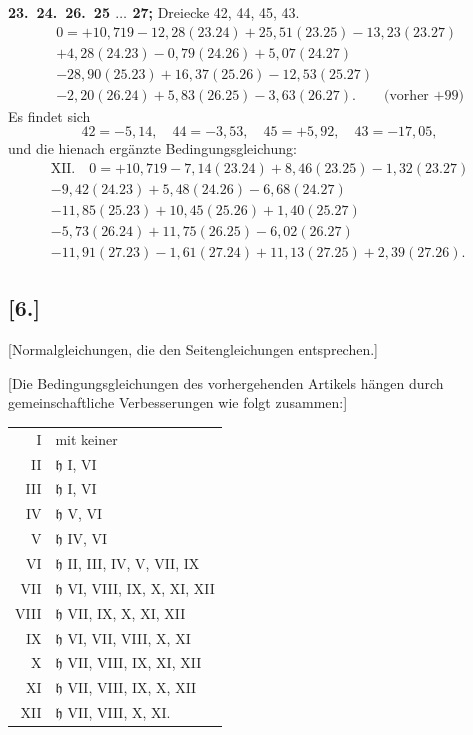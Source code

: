\documentclass[12pt,a4paper]{article}
\theoremstyle{plain}
\theoremstyle{definition}
\theoremstyle{remark}
\begin{document}
\medskip\noindent
\textbf{23.\ 24.\ 26.\ 25 $\ldots$ 27;} Dreiecke 42, 44, 45, 43.
\begin{multline*}
0 = +10{,}719 - 12{,}28(23.24) + 25{,}51(23.25) - 13{,}23(23.27)\\
+ 4{,}28(24.23) - 0{,}79(24.26) + 5{,}07(24.27)\\
- 28{,}90(25.23) + 16{,}37(25.26) - 12{,}53(25.27)\\
- 2{,}20(26.24) + 5{,}83(26.25) - 3{,}63(26.27).\qquad\text{(vorher $+99$)}
\end{multline*}
Es findet sich
\[42 = -5{,}14, \quad 44 = -3{,}53, \quad 45 = +5{,}92, \quad 43 = -17{,}05,\]
und die hienach erg\"anzte Bedingungsgleichung:
\begin{multline*}
\text{XII.}\quad 0 = +10{,}719 - 7{,}14(23.24) + 8{,}46(23.25) - 1{,}32(23.27)\\
- 9{,}42(24.23) + 5{,}48(24.26) - 6{,}68(24.27)\\
- 11{,}85(25.23) + 10{,}45(25.26) + 1{,}40(25.27)\\
- 5{,}73(26.24) + 11{,}75(26.25) - 6{,}02(26.27)\\
- 11{,}91(27.23) - 1{,}61(27.24) + 11{,}13(27.25) + 2{,}39(27.26).
\end{multline*}

\newpage
\subsection*{[6.]}
\label{subsec:netz6}

[Normalgleichungen, die den Seitengleichungen entsprechen.]

[Die Bedingungsgleichungen des vorhergehenden Artikels h\"angen durch gemeinschaftliche Verbesserungen wie folgt zusammen:]
\begin{center}
\begin{tabular}{r@{\ }l}
I & mit keiner\\
II & $\mathfrak{h}$ I, VI\\
III & $\mathfrak{h}$ I, VI\\
IV & $\mathfrak{h}$ V, VI\\
V & $\mathfrak{h}$ IV, VI\\
VI & $\mathfrak{h}$ II, III, IV, V, VII, IX\\
VII & $\mathfrak{h}$ VI, VIII, IX, X, XI, XII\\
VIII & $\mathfrak{h}$ VII, IX, X, XI, XII\\
IX & $\mathfrak{h}$ VI, VII, VIII, X, XI\\
X & $\mathfrak{h}$ VII, VIII, IX, XI, XII\\
XI & $\mathfrak{h}$ VII, VIII, IX, X, XII\\
XII & $\mathfrak{h}$ VII, VIII, X, XI.
\end{tabular}
\end{center}
\end{document}
